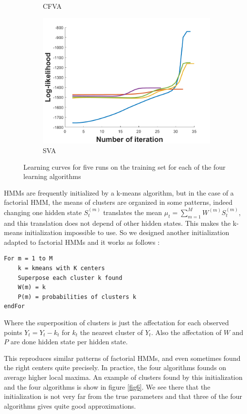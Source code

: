 \documentclass{article}
\begin{document}
\begin{figure}
\begin{subfigure}[b]{0.5\linewidth}
    \caption{CFVA} 
  \end{subfigure}%
  \begin{subfigure}[b]{0.5\linewidth}
    \centering
    \includegraphics[width=0.75\linewidth]{init_sva.png} 
    \caption{SVA} 
  \end{subfigure} 
  \caption{Learning curves for five runs on the training set for each of the four learning algorithms}
  \label{fig4} 
\end{figure}

HMMs are frequently initialized by a k-means algorithm, but in the case of a factorial HMM, the means of clusters are organized in some patterns, indeed changing one hidden state $S^{(m)}_t$ translates the mean $\mu_t = \sum_{m=1}^M W^{(m)} S_t^{(m)}$, and this translation does not depend of other hidden states. This makes the k-means initialization impossible to use. So we designed another initialization adapted to factorial HMMs and it works as follows :
\begin{verbatim}
For m = 1 to M
    k = kmeans with K centers
    Superpose each cluster k found
    W(m) = k
    P(m) = probabilities of clusters k
endFor
\end{verbatim}
Where the superposition of clusters is just the affectation for each observed points $Y_t = Y_t - k_t$ for $k_t$ the nearest cluster of $Y_t$. Also the affectation of $W$ and $P$ are done hidden state per hidden state.

This reproduces similar patterns of factorial HMMs, and even sometimes found the right centers quite precisely. In practice, the four algorithms founds on average higher local maxima. An example of clusters found by this initialization and the four algorithms is show in figure \ref{fig6}. We see there that the initialization is not very far from the true parameters and that three of the four algorithms gives quite good approximations.
\end{document}
